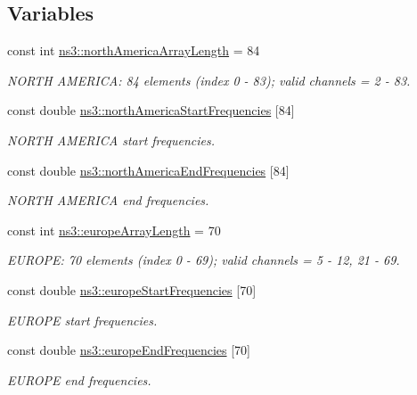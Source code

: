 \subsection*{Variables}
\begin{DoxyCompactItemize}
\item 
const int \hyperlink{namespacens3_a74efef1e0d1e67a89e219a39f06b881e}{ns3\+::north\+America\+Array\+Length} = 84
\begin{DoxyCompactList}\small\item\em N\+O\+R\+TH A\+M\+E\+R\+I\+CA\+: 84 elements (index 0 -\/ 83); valid channels = 2 -\/ 83. \end{DoxyCompactList}\item 
const double \hyperlink{namespacens3_abd0dc95c8909f85e962a681d932219d3}{ns3\+::north\+America\+Start\+Frequencies} \mbox{[}84\mbox{]}
\begin{DoxyCompactList}\small\item\em N\+O\+R\+TH A\+M\+E\+R\+I\+CA start frequencies. \end{DoxyCompactList}\item 
const double \hyperlink{namespacens3_a0808a28c1d4e8691369f8d7700e6deaa}{ns3\+::north\+America\+End\+Frequencies} \mbox{[}84\mbox{]}
\begin{DoxyCompactList}\small\item\em N\+O\+R\+TH A\+M\+E\+R\+I\+CA end frequencies. \end{DoxyCompactList}\item 
const int \hyperlink{namespacens3_ac2219660b69e86f221be17c4f0cfac4d}{ns3\+::europe\+Array\+Length} = 70
\begin{DoxyCompactList}\small\item\em E\+U\+R\+O\+PE\+: 70 elements (index 0 -\/ 69); valid channels = 5 -\/ 12, 21 -\/ 69. \end{DoxyCompactList}\item 
const double \hyperlink{namespacens3_aa7262dcdf15461a937bb8d2afa65288c}{ns3\+::europe\+Start\+Frequencies} \mbox{[}70\mbox{]}
\begin{DoxyCompactList}\small\item\em E\+U\+R\+O\+PE start frequencies. \end{DoxyCompactList}\item 
const double \hyperlink{namespacens3_a6c355aa904ccf868b6609c0ef6221787}{ns3\+::europe\+End\+Frequencies} \mbox{[}70\mbox{]}
\begin{DoxyCompactList}\small\item\em E\+U\+R\+O\+PE end frequencies. \end{DoxyCompactList}\item 

\end{DoxyCompactItemize}
